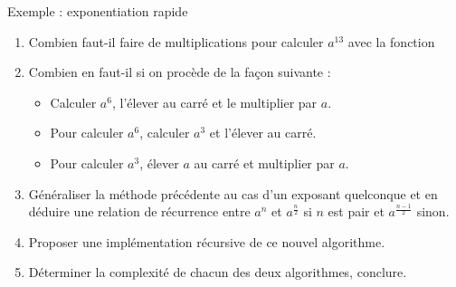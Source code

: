 \documentclass[10pt]{beamer}
\begin{document}
\begin{frame}[fragile]{\Ctitle}{\stitle}
	\begin{exampleblock}{Exemple : exponentiation rapide}
		\begin{enumerate}
			\item<1->{\small Combien faut-il faire de multiplications pour calculer $a^{13}$ avec la fonction}
			\item<2-> {\small Combien en faut-il si on procède de la façon suivante :}
				\begin{itemize}
					\item<3-> Calculer $a^6$, l'élever au carré et le multiplier par $a$.
					\item<4-> Pour calculer $a^6$, calculer $a^3$ et l'élever au carré.
					\item<5-> Pour calculer $a^3$, élever $a$ au carré et multiplier par $a$.
				\end{itemize}
			\item<6-> {\small Généraliser la méthode précédente au cas d'un exposant quelconque et en déduire une relation de récurrence entre $a^n$ et $a^\frac{n}{2}$ si $n$ est pair et $a^\frac{n-1}{2}$ sinon.}
			\item<7-> {\small Proposer une implémentation récursive de ce nouvel algorithme.}
			\item<8-> {\small Déterminer la complexité de chacun des deux algorithmes, conclure.}
		\end{enumerate}
	\end{exampleblock}
\end{frame}
\end{document}
